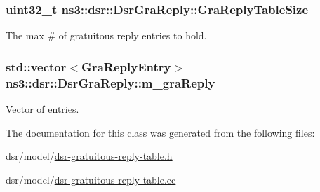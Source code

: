 \subsubsection[{\texorpdfstring{Gra\+Reply\+Table\+Size}{GraReplyTableSize}}]{\setlength{\rightskip}{0pt plus 5cm}uint32\+\_\+t ns3\+::dsr\+::\+Dsr\+Gra\+Reply\+::\+Gra\+Reply\+Table\+Size\hspace{0.3cm}{\ttfamily [private]}}\hypertarget{classns3_1_1dsr_1_1DsrGraReply_a506a24375a22d638afa8d42daeecb368}{}\label{classns3_1_1dsr_1_1DsrGraReply_a506a24375a22d638afa8d42daeecb368}


The max \# of gratuitous reply entries to hold. 

\subsubsection[{\texorpdfstring{m\+\_\+gra\+Reply}{m_graReply}}]{\setlength{\rightskip}{0pt plus 5cm}std\+::vector$<${\bf Gra\+Reply\+Entry}$>$ ns3\+::dsr\+::\+Dsr\+Gra\+Reply\+::m\+\_\+gra\+Reply\hspace{0.3cm}{\ttfamily [private]}}\hypertarget{classns3_1_1dsr_1_1DsrGraReply_a406e9b99c8a2d8bd6a4d579468f00d12}{}\label{classns3_1_1dsr_1_1DsrGraReply_a406e9b99c8a2d8bd6a4d579468f00d12}


Vector of entries. 



The documentation for this class was generated from the following files\+:\begin{DoxyCompactItemize}
\item 
dsr/model/\hyperlink{dsr-gratuitous-reply-table_8h}{dsr-\/gratuitous-\/reply-\/table.\+h}\item 
dsr/model/\hyperlink{dsr-gratuitous-reply-table_8cc}{dsr-\/gratuitous-\/reply-\/table.\+cc}\end{DoxyCompactItemize}
